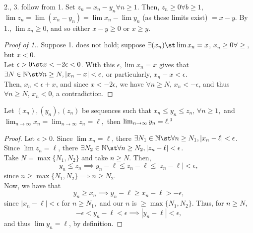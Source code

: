 \documentclass[12pt]{article}
\begin{document}
\begin{remark}
  2., 3. follow from 1. Set $z_n = x_n - y_n \forall n \geq 1$. Then, $z_n \geq 0 \forall b \geq 1$, $\lim z_n = \lim (x_n-y_n) = \lim x_n - \lim y_n$ (as these limits exist) $= x-y$. By 1., $\lim z_n \geq 0$, and so either $x - y \geq 0$ or $x \geq y$.
\end{remark}

\begin{proof}[Proof of 1.]
   Suppose 1. does not hold; suppose $\exists (x_n) \st \lim x_n = x$, $x_n \geq 0 \forall \geq,$ but $x <0$.\\
   Let $\epsilon > 0 \st x < -2 \epsilon < 0$. With this $\epsilon, \lim x_n = x$ gives that $\exists N \in \mathbb N \st \forall n \geq N, |x_n - x| < \epsilon$, or particularly, $x_n - x < \epsilon$.\\
   Then, $x_n < \epsilon + x$, and since $x < -2 \epsilon$, we have $\forall n \geq N$, $x_n < -\epsilon$, and thus $\forall n \geq N$, $x_n < 0$, a contradiction.
\end{proof}

\begin{theorem}
  Let $(x_n), (y_n), (z_n)$ be sequences such that \(x_n \leq y_n \leq z_n, \,\forall n \geq 1,\) and \(\lim_{n \to \infty} x_n = \lim_{n \to \infty} z_n = \ell,\) then \(\lim_{n \to \infty}y_n = \ell.\footnotemark\)
\end{theorem}

\begin{proof}
  Let $\epsilon > 0$. Since $\lim x_n = \ell$, there $\exists N_1 \in \mathbb{N} \st \forall n \geq N_1, |x_n - \ell| < \epsilon$.\\
  Since $\lim z_n = \ell$, there $\exists N_2 \in \mathbb{N} \st \forall n \geq N_2, |z_n - \ell| < \epsilon$.\\
  Take $N = \max \{N_1,N_2\}$ and take $n \geq N$. Then, \[y_n \leq z_n \implies y_n - \ell \leq z_n - \ell \leq |z_n - \ell| < \epsilon,\] since $n \geq \max\{N_1, N_2\} \implies n \geq N_2.$\\
  Now, we have that \[y_n \geq x_n \implies y_n - \ell \geq x_n - \ell > - \epsilon, \] since $|x_n - \ell| < \epsilon $ for $n \geq N_1,$ and our $n$ is $\geq \max\{N_1,N_2\}.$ Thus, for $n \geq N$, \[-\epsilon < y_n - \ell < \epsilon \implies |y_n - \ell| < \epsilon,\] and thus $\lim y_n = \ell$, by definition.
\end{proof}
\end{document}
